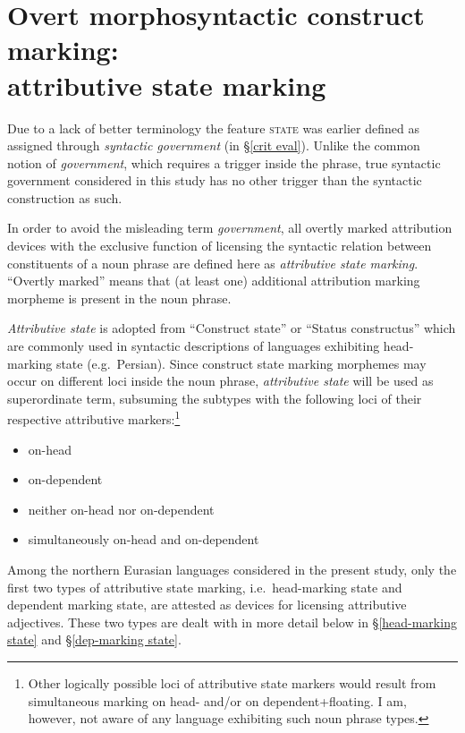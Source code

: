 \section[Construct marking]{Overt morphosyntactic construct marking:\\attributive state marking}

Due to a lack of better terminology the feature \textsc{state} was earlier defined as assigned through \emph{syntactic government} (in \S\ref{crit eval}). Unlike the common notion of \emph{government}, which requires a trigger inside the phrase, true syntactic government considered in this study has no other trigger than the syntactic construction as such.

In order to avoid the misleading term \emph{government}, all overtly marked attribution devices with the exclusive function of licensing the syntactic relation between constituents of a noun phrase are defined here as \emph{attributive state marking}. “Overtly marked” means that (at least one) additional attribution marking morpheme is present in the noun phrase.

\emph{Attributive state} is adopted from “Construct state” or “Status constructus” which are commonly used in syntactic descriptions of languages exhibiting head-marking {state} (e.g.~Persian). Since construct state marking morphemes may occur on different loci inside the noun phrase, \emph{attributive state} will be used as superordinate term, subsuming the subtypes with the following loci of their respective attributive markers:\footnote{Other logically possible loci of attributive state markers would result from simultaneous marking on head- and\fshyp{}or on dependent+floating. I am, however, not aware of any language exhibiting such noun phrase types.}
\begin{itemize}
\settowidth{}
\item on-head 
\item on-dependent 
\item neither on-head nor on-dependent 
\item simultaneously on-head and on-dependent 
\end{itemize}
Among the northern Eurasian languages considered in the present study, only the first two types of attributive state marking, i.e.~head-marking state and dependent marking state, are attested as devices for licensing attributive adjectives. These two types are dealt with in more detail below in \S\ref{head-marking state} and \S\ref{dep-marking state}.

